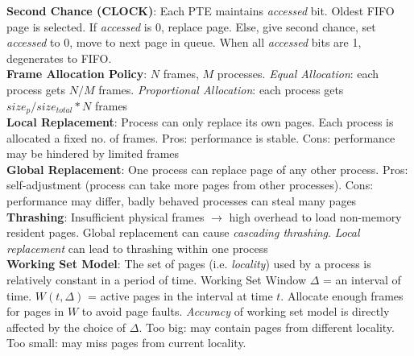 \documentclass{article}
\begin{document}
{\begin{multicols*}{3}
\textbf{Second Chance (CLOCK)}: Each PTE maintains \textit{accessed} bit. Oldest FIFO page is selected. If \textit{accessed} is 0, replace page. Else, give second chance, set \textit{accessed} to 0, move to next page in queue. When all \textit{accessed} bits are 1, degenerates to FIFO. \\
\textbf{Frame Allocation Policy}: $N$ frames, $M$ processes. \textit{Equal Allocation}: each process gets $N/M$ frames. \textit{Proportional Allocation}: each process gets $size_p/size_{total} * N$ frames \\
\textbf{Local Replacement}: Process can only replace its own pages. Each process is allocated a fixed no. of frames. Pros: performance is stable. Cons: performance may be hindered by limited frames \\
\textbf{Global Replacement}: One process can replace page of any other process. Pros: self-adjustment (process can take more pages from other processes). Cons: performance may differ, badly behaved processes can steal many pages \\
\textbf{Thrashing}: Insufficient physical frames $\to$ high overhead to load non-memory resident pages. Global replacement can cause \textit{cascading thrashing}. \textit{Local replacement} can lead to thrashing within one process\\
\textbf{Working Set Model}: The set of pages (i.e. \textit{locality}) used by a process is relatively constant in a period of time. Working Set Window $\Delta$ = an interval of time. $W(t,\Delta)$ = active pages in the interval at time $t$. Allocate enough frames for pages in $W$ to avoid page faults. \textit{Accuracy} of working set model is directly affected by the choice of $\Delta$. Too big: may contain pages from different locality. Too small: may miss pages from current locality.

\end{multicols*}}
\end{document}
